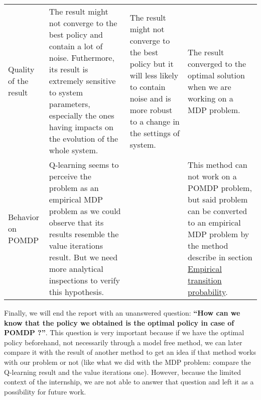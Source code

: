 \documentclass[
  a4paper, xcolor = usenames,dvipsnames]{article}
\theoremstyle{definition}
\theoremstyle{definition}
\theoremstyle{definition}
\theoremstyle{definition}
\theoremstyle{remark}
\begin{document}
\begin{longtable}[]{@{}llll@{}}
\begin{minipage}[t]{0.18\columnwidth}
Quality of the result\strut
\end{minipage} & \begin{minipage}[t]{0.35\columnwidth}\raggedright
The result might not converge to the best policy and contain a lot of noise. Futhermore, its result is extremely sensitive to system parameters, especially the ones having impacts on the evolution of the whole system.\strut
\end{minipage} & \begin{minipage}[t]{0.18\columnwidth}\raggedright
The result might not converge to the best policy but it will less likely to contain noise and is more robust to a change in the settings of system.\strut
\end{minipage} & \begin{minipage}[t]{0.18\columnwidth}\raggedright
The result converged to the optimal solution when we are working on a MDP problem.\strut
\end{minipage}\tabularnewline
\begin{minipage}[t]{0.18\columnwidth}\raggedright
Behavior on POMDP\strut
\end{minipage} & \begin{minipage}[t]{0.35\columnwidth}\raggedright
Q-learning seems to perceive the problem as an empirical MDP problem as we could observe that its results resemble the value iterations result. But we need more analytical inspections to verify this hypothesis.\strut
\end{minipage} & \begin{minipage}[t]{0.18\columnwidth}\raggedright
\strut
\end{minipage} & \begin{minipage}[t]{0.18\columnwidth}\raggedright
This method can not work on a POMDP problem, but said problem can be converted to an empirical MDP problem by the method describe in section \protect\hyperlink{empirical-transition-probability}{Empirical transition probability}.\strut
\end{minipage}\tabularnewline
\bottomrule
\end{longtable}

Finally, we will end the report with an unanswered question: \textbf{``How can we know that the policy we obtained is the optimal policy in case of POMDP ?''}. This question is very important because if we have the optimal policy beforehand, not necessarily through a model free method, we can later compare it with the result of another method to get an idea if that method works with our problem or not (like what we did with the MDP problem: compare the Q-learning result and the value iterations one). However, because the limited context of the internship, we are not able to answer that question and left it as a possibility for future work.

\newpage

\printbibliography
\end{document}
